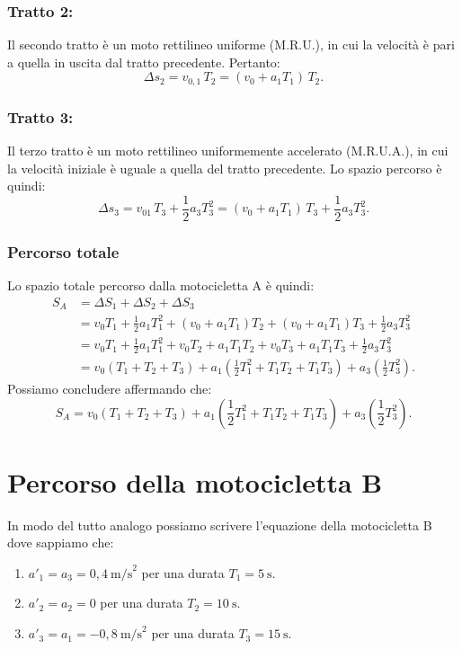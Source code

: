 \documentclass[a4paper,11pt]{article}
\begin{document}
\subsubsection{Tratto 2:}
Il secondo tratto è un moto rettilineo uniforme (M.R.U.), in cui la velocità è pari
a quella in uscita dal tratto precedente. Pertanto:
\[
\Delta s_2 = v_{0,1}\,T_2 = (v_0 + a_1 T_1)\,T_2.
\]
\subsubsection{Tratto 3:}
Il terzo tratto è un moto rettilineo uniformemente accelerato (M.R.U.A.), in cui
la velocità iniziale è uguale a quella del tratto precedente. Lo spazio percorso è quindi:
\[
\Delta s_3 = v_{01}\,T_3 + \frac{1}{2} a_3 T_3^2
           = (v_0 + a_1 T_1)\,T_3 + \frac{1}{2} a_3 T_3^2.
\]
\subsubsection{Percorso totale}
Lo spazio totale percorso dalla motocicletta A è quindi:
\[
\begin{aligned}
S_A &= \Delta S_1 + \Delta S_2 + \Delta S_3 \\[4pt]
&= v_0 T_1 + \frac{1}{2} a_1 T_1^2 
   + (v_0 + a_1 T_1) T_2 
   + (v_0 + a_1 T_1) T_3 
   + \frac{1}{2} a_3 T_3^2 \\[6pt]
&= v_0 T_1 + \frac{1}{2} a_1 T_1^2 
   + v_0 T_2 + a_1 T_1 T_2 
   + v_0 T_3 + a_1 T_1 T_3 
   + \frac{1}{2} a_3 T_3^2 \\[6pt]
&= v_0 (T_1 + T_2 + T_3)
   + a_1 \left( \frac{1}{2} T_1^2 + T_1 T_2 + T_1 T_3 \right)
   + a_3 \left( \frac{1}{2} T_3^2 \right).
\end{aligned}
\]
Possiamo concludere affermando che:
\[
S_A = v_0 (T_1 + T_2 + T_3)
      + a_1 \left( \frac{1}{2} T_1^2 + T_1 T_2 + T_1 T_3 \right)
      + a_3 \left( \frac{1}{2} T_3^2 \right).\tag{1}
\]

\section*{Percorso della motocicletta B}
In modo del tutto analogo possiamo scrivere l'equazione della motocicletta B dove sappiamo che:
\begin{enumerate}
\item $a'_1 = a_3 = 0{,}4\ \text{m/s}^2$ per una durata $T_1 = 5\ \text{s}$.

\item $a'_2 = a_2 = 0$ per una durata $T_2 = 10\ \text{s}$.

\item $a'_3 = a_1 = -0{,}8\ \text{m/s}^2$ per una durata $T_3 = 15\ \text{s}$.
\end{enumerate}
\end{document}
